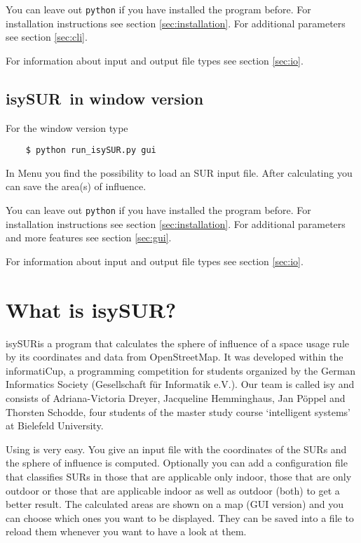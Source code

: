 \documentclass[11pt,fleqn]{book} %
\newcommand{\todol}{\todo[inline]} %
\newcommand{\ProjectTitle}{isySUR}
\newcommand{\pt}{\ProjectTitle}
\begin{document}
You can leave out \texttt{python} if you have installed the program before. For installation instructions see section \ref{sec:installation}. For additional parameters see section \ref{sec:cli}.

For information about input and output file types see section \ref{sec:io}.

\subsection{\ProjectTitle\ in window version}\label{sec:QuickstartWindow}
For the window version type
\begin{verbatim}
	$ python run_isySUR.py gui
\end{verbatim}
In Menu you find the possibility to load an SUR input file. After calculating you can save the area(s) of influence.

You can leave out \texttt{python} if you have installed the program before. For installation instructions see section \ref{sec:installation}. For additional parameters and more features see section \ref{sec:gui}.

For information about input and output file types see section \ref{sec:io}.

\section{What is \ProjectTitle?}\label{sec:whatFor}
\todol{add screenshot}
\pt is a program that calculates the sphere of influence of a space usage rule by its coordinates and data from OpenStreetMap. It was developed within the informatiCup, a programming competition for students organized by the German Informatics Society (Gesellschaft für Informatik e.V.). Our team is called isy and consists of Adriana-Victoria Dreyer, Jacqueline Hemminghaus, Jan Pöppel and Thorsten Schodde, four students of the master study course `intelligent systems' at Bielefeld University.

Using is very easy. You give an input file with the coordinates of the SURs and the sphere of influence is computed. Optionally you can add a configuration file that classifies SURs in those that are applicable only indoor, those that are only outdoor or those that are applicable indoor as well as outdoor (both) to get a better result. The calculated areas are shown on a map (GUI version) and you can choose which ones you want to be displayed. They can be saved into a file to reload them whenever you want to have a look at them.
\end{document}
